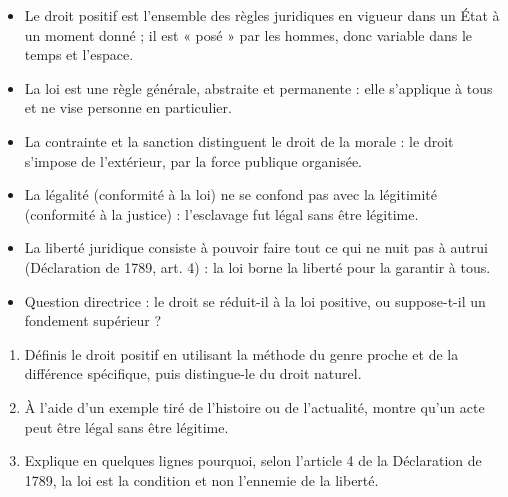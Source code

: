 \documentclass[11pt]{article}
\newcommand{\cle}[1]{{\popxbold\color{popdark}#1}}
\begin{document}
\begin{aretenir}
\begin{itemize}
  \item Le \cle{droit positif} est l'ensemble des règles juridiques en vigueur dans un État à un moment donné ; il est « posé » par les hommes, donc variable dans le temps et l'espace.
  \item La \cle{loi} est une règle générale, abstraite et permanente : elle s'applique à tous et ne vise personne en particulier.
  \item La \cle{contrainte} et la \cle{sanction} distinguent le droit de la morale : le droit s'impose de l'extérieur, par la force publique organisée.
  \item La \cle{légalité} (conformité à la loi) ne se confond pas avec la \cle{légitimité} (conformité à la justice) : l'esclavage fut légal sans être légitime.
  \item La \cle{liberté} juridique consiste à pouvoir faire tout ce qui ne nuit pas à autrui (Déclaration de 1789, art. 4) : la loi borne la liberté pour la garantir à tous.
  \item Question directrice : le droit se réduit-il à la loi positive, ou suppose-t-il un fondement supérieur ?
\end{itemize}
\end{aretenir}

\begin{exercice}
\begin{enumerate}
  \item Définis le droit positif en utilisant la méthode du genre proche et de la différence spécifique, puis distingue-le du droit naturel.
  \item À l'aide d'un exemple tiré de l'histoire ou de l'actualité, montre qu'un acte peut être légal sans être légitime.
  \item Explique en quelques lignes pourquoi, selon l'article 4 de la Déclaration de 1789, la loi est la condition et non l'ennemie de la liberté.
\end{enumerate}
\end{exercice}
\end{document}
